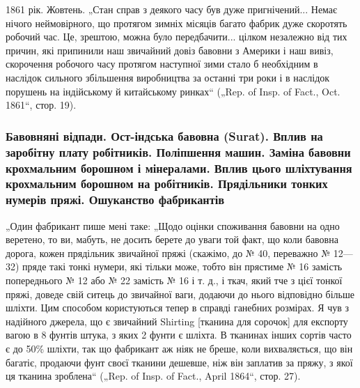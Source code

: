 1861 рік. Жовтень. „Стан справ з деякого часу був дуже
пригнічений... Немає нічого неймовірного, що протягом зимніх
місяців багато фабрик дуже скоротять робочий час. Це, зрештою,
можна було передбачити... цілком незалежно від тих причин,
які припинили наш звичайний довіз бавовни з Америки і наш вивіз,
скорочення робочого часу протягом наступної зими стало б
необхідним в наслідок сильного збільшення виробництва за
останні три роки і в наслідок порушень на індійському й китайському
ринках“ („Rep. of Insp. of Fact., Oct. 1861“, стор. 19).

\subsubsection{Бавовняні відпади. Ост-індська бавовна (Surat). Вплив на заробітну плату
робітників. Поліпшення машин. Заміна бавовни крохмальним борошном і
мінералами. Вплив цього шліхтування крохмальним борошном на робітників.
Прядільники тонких нумерів пряжі. Ошуканство фабрикантів}

„Один фабрикант пише мені таке: „Щодо оцінки споживання
бавовни на одно веретено, то ви, мабуть, не досить берете до
уваги той факт, що коли бавовна дорога, кожен прядільник
звичайної пряжі (скажімо, до № 40, переважно № 12—32) пряде
такі тонкі нумери, які тільки може, тобто він прястиме № 16
замість попереднього № 12 або № 22 замість № 16 і т. д.,
і ткач, який тче з цієї тонкої пряжі, доведе свій ситець до
звичайної ваги, додаючи до нього відповідно більше шліхти.
Цим способом користуються тепер в справді ганебних розмірах.
Я чув з надійного джерела, що є звичайний Shirting [тканина
для сорочок] для експорту вагою в 8 фунтів штука, з яких
2  фунти є шліхта. В тканинах інших сортів часто є до 50\%
шліхти, так що фабрикант аж ніяк не бреше, коли вихваляється,
що він багатіє, продаючи фунт своєї тканини дешевше, ніж він
заплатив за пряжу, з якої ця тканина зроблена“ („Rep. of Insp.
of Fact., April 1864“, стор. 27).

